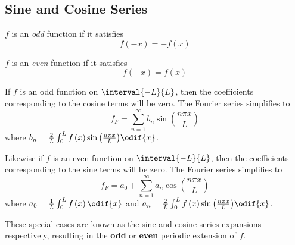 \documentclass{article}
\begin{document}
\subsection{Sine and Cosine Series}
    \begin{definition}
        \(f\) is an \textit{odd} function if it satisfies
        \begin{equation*}
            f\left( -x \right) = -f\left( x \right)
        \end{equation*}     
    \end{definition}
    \begin{definition}
        \(f\) is an \textit{even} function if it satisfies
        \begin{equation*}
            f\left( -x \right) = f\left( x \right)
        \end{equation*}     
    \end{definition}
    If \(f\) is an odd function on \(\interval{-L}{L}\), then the coefficients corresponding to the cosine terms will be zero.
    The Fourier series simplifies to
    \begin{equation*}
        f_F = \sum_{n = 1}^\infty b_n \sin{\left( \frac{n \pi x}{L} \right)}
    \end{equation*}
    where \(b_n = \frac{2}{L} \int_0^L f\left( x \right) \sin{\left( \frac{n \pi x}{L} \right)} \odif{x}\).

    Likewise if \(f\) is an even function on \(\interval{-L}{L}\), then the coefficients corresponding to the sine terms will be zero.
    The Fourier series simplifies to
    \begin{equation*}
        f_F = a_0 + \sum_{n = 1}^\infty a_n \cos{\left( \frac{n \pi x}{L} \right)}
    \end{equation*}
    where \(a_0 = \frac{1}{L} \int_0^L f\left( x \right) \odif{x}\) and \(a_n = \frac{2}{L} \int_0^L f\left( x \right) \sin{\left( \frac{n \pi x}{L} \right)} \odif{x}\).

    These special cases are known as the sine and cosine series expansions respectively, resulting in the \textbf{odd} or \textbf{even} periodic extension of \(f\).
\end{document}

